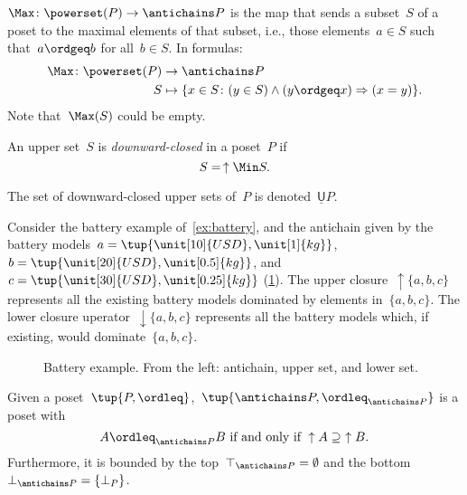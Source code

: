 \begin{definition}[Max]
\label{def:Max}
$\Max \colon \powerset(P) \to \antichains P$ is the map that sends a subset~$S$ of a poset to the maximal elements of that subset, i.e., those elements~$a \in S$ such that~$a \ordgeq b$ for all~$b \in S$. In formulas:
\begin{equation}
    \begin{aligned}
    \Max \colon \powerset(P) &\to \antichains P\\
    S&\mapsto \{ x\in S\colon (y\in S)\wedge(y\ordgeq x)\Rightarrow (x=y)\}.
    \end{aligned}
\end{equation}
Note that~$\Max(S)$ could be empty.
\end{definition}


\begin{definition}
\label{def:downward-closed-upperset}
An upper set~$S$ is \emph{downward-closed} in a poset~$P$ if
\begin{equation}
    S =\, \uparrow \Min S.
\end{equation}
\end{definition}
\begin{remark}
The set of downward-closed upper sets of~$P$ is denoted~$\underline{\mathsf{U}}P$.
\end{remark}

\begin{example}
Consider the battery example of~\cref{ex:battery}, and the antichain given by the battery models~$a=\tup{\unit[10]{USD},\unit[1]{kg}}$,~$b=\tup{\unit[20]{USD},\unit[0.5]{kg}}$, and~$c=\tup{\unit[30]{USD},\unit[0.25]{kg}}$ (\cref{fig:examplebatt}).
The upper closure~$\uparrow \{a,b,c\}$ represents all the existing battery models dominated by elements in~$\{a,b,c\}$. The lower closure uperator~$\downarrow\{a,b,c\}$ represents all the battery models which, if existing, would dominate~$\{a,b,c\}$.
\begin{figure}[h!]
\begin{center}
\end{center}
\caption{Battery example. From the left: antichain, upper set, and lower set. \label{fig:examplebatt}}
\end{figure}
\end{example}

\begin{lemma}
Given a poset~$\tup{P,\ordleq}$,~$\tup{\antichains P,\ordleq_{\antichains P}}$ is a poset with
\begin{equation}
\label{eq:orderantichain}
    A\ordleq_{\antichains P} B \text{ if and only if } \uparrow A \supseteq \ \uparrow B.
\end{equation}
Furthermore, it is bounded by the top~$\top_{\antichains P}=\emptyset$ and the bottom~$\bot_{\antichains P}=\{\bot_P\}$.
\end{lemma}

